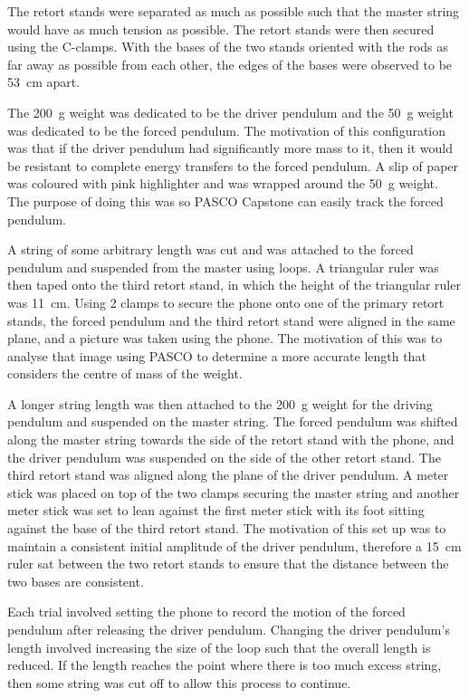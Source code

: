 \documentclass[letterpaper, 12pt]{article}
\begin{document}
The retort stands were separated
as much as possible such that the
master string would have as much
tension as possible. The retort stands
were then secured using the C-clamps.
With
the bases of the two stands oriented with
the rods as far away as possible from each other,
the edges of the bases were observed to be \SI{53}{cm}
apart.

The \SI{200}{g} weight was dedicated to be the
driver pendulum and the \SI{50}{g} weight was dedicated
to be the forced pendulum. The motivation of this configuration
was that if the driver pendulum had significantly more
mass to it, then it would be resistant to complete
energy transfers to the forced pendulum.
A slip of paper was coloured with pink highlighter
and was wrapped around the \SI{50}{g} weight. The
purpose of doing this was so PASCO Capstone can
easily track the forced pendulum.

A string of some arbitrary length was cut and
was attached to the forced pendulum and suspended
from the master using loops. A triangular ruler
was then taped onto the third retort stand,
in which the height of the triangular ruler was
\SI{11}{cm}. Using 2 clamps to secure the phone onto one
of the primary retort stands, the forced pendulum
and the third retort stand were aligned in the
same plane, and a picture was taken using the phone.
The motivation of this was to analyse
that image using PASCO to determine
a more accurate length that
considers the centre of mass of the weight.

A longer string length was then attached
to the \SI{200}{g} weight for the driving
pendulum and suspended on the master string.
The forced pendulum was shifted along the
master string towards the side of the retort
stand with the phone, and the driver pendulum
was suspended on the side of the other
retort stand. The third retort stand
was aligned along the plane of the
driver pendulum. A meter stick was placed
on top of the two clamps securing the master
string and another meter stick was
set to lean against the first meter stick
with its foot sitting against the base
of the third retort stand. The motivation
of this set up was to maintain a consistent
initial amplitude of the driver
pendulum, therefore a \SI{15}{cm}
ruler sat between the two
retort stands to ensure that the distance between
the two bases are consistent.

Each trial involved setting the phone
to record the motion of the forced
pendulum after releasing the driver
pendulum. Changing the driver pendulum's
length involved increasing the size of the loop
such that the overall length is reduced.
If the length reaches the point where
there is too much excess string, then
some string was cut off to allow this process
to continue.
\end{document}
